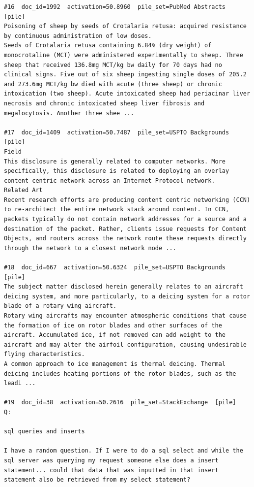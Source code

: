 \begin{verbatim}
#16  doc_id=1992  activation=50.8960  pile_set=PubMed Abstracts  [pile]
Poisoning of sheep by seeds of Crotalaria retusa: acquired resistance by continuous administration of low doses.
Seeds of Crotalaria retusa containing 6.84% (dry weight) of monocrotaline (MCT) were administered experimentally to sheep. Three sheep that received 136.8mg MCT/kg bw daily for 70 days had no clinical signs. Five out of six sheep ingesting single doses of 205.2 and 273.6mg MCT/kg bw died with acute (three sheep) or chronic intoxication (two sheep). Acute intoxicated sheep had periacinar liver necrosis and chronic intoxicated sheep liver fibrosis and megalocytosis. Another three shee ...

#17  doc_id=1409  activation=50.7487  pile_set=USPTO Backgrounds  [pile]
Field
This disclosure is generally related to computer networks. More specifically, this disclosure is related to deploying an overlay content centric network across an Internet Protocol network.
Related Art
Recent research efforts are producing content centric networking (CCN) to re-architect the entire network stack around content. In CCN, packets typically do not contain network addresses for a source and a destination of the packet. Rather, clients issue requests for Content Objects, and routers across the network route these requests directly through the network to a closest network node ...

#18  doc_id=667  activation=50.6324  pile_set=USPTO Backgrounds  [pile]
The subject matter disclosed herein generally relates to an aircraft deicing system, and more particularly, to a deicing system for a rotor blade of a rotary wing aircraft.
Rotary wing aircrafts may encounter atmospheric conditions that cause the formation of ice on rotor blades and other surfaces of the aircraft. Accumulated ice, if not removed can add weight to the aircraft and may alter the airfoil configuration, causing undesirable flying characteristics.
A common approach to ice management is thermal deicing. Thermal deicing includes heating portions of the rotor blades, such as the leadi ...

#19  doc_id=38  activation=50.2616  pile_set=StackExchange  [pile]
Q:

sql queries and inserts

I have a random question. If I were to do a sql select and while the sql server was querying my request someone else does a insert statement... could that data that was inputted in that insert statement also be retrieved from my select statement?


\end{verbatim}
